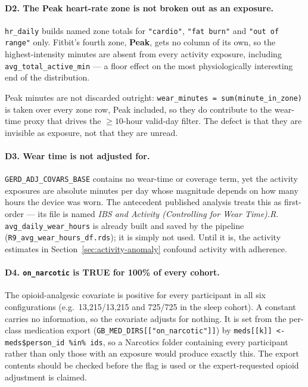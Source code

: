 \documentclass[11pt]{article}
\newcommand{\code}[1]{\texttt{\small #1}}
\begin{document}
\paragraph{D2. The Peak heart-rate zone is not broken out as an exposure.}
\code{hr_daily} builds named zone totals for \code{"cardio"}, \code{"fat burn"} and
\code{"out of range"} only. Fitbit's fourth zone, \textbf{Peak}, gets no column of its own, so the
highest-intensity minutes are absent from every activity exposure, including
\code{avg_total_active_min} --- a floor effect on the most physiologically interesting end of the
distribution.

Peak minutes are not discarded outright: \code{wear_minutes = sum(minute_in_zone)} is taken over
every zone row, Peak included, so they do contribute to the wear-time proxy that drives the
$\geq 10$-hour valid-day filter. The defect is that they are invisible as exposure, not that they
are unread.

\paragraph{D3. Wear time is not adjusted for.}
\code{GERD_ADJ_COVARS_BASE} contains no wear-time or coverage term, yet the activity exposures are
absolute minutes per day whose magnitude depends on how many hours the device was worn. The
antecedent published analysis treats this as first-order --- its file is named
\textit{IBS and Activity (Controlling for Wear Time).R}. \code{avg_daily_wear_hours} is already
built and saved by the pipeline (\code{R9_avg_wear_hours_df.rds}); it is simply not used. Until it
is, the activity estimates in Section~\ref{sec:activity-anomaly} confound activity with adherence.

\paragraph{D4. \code{on_narcotic} is TRUE for 100\% of every cohort.}
The opioid-analgesic covariate is positive for every participant in all six configurations
(e.g.\ 13{,}215/13{,}215 and 725/725 in the sleep cohort). A constant carries no information, so
the covariate adjusts for nothing. It is set from the per-class medication export
(\code{GB_MED_DIRS[["on_narcotic"]]}) by \code{meds[[k]] <- meds\$person_id \%in\% ids}, so a
Narcotics folder containing every participant rather than only those with an exposure would
produce exactly this. The export contents should be checked before the flag is used or the
expert-requested opioid adjustment is claimed.
\end{document}
